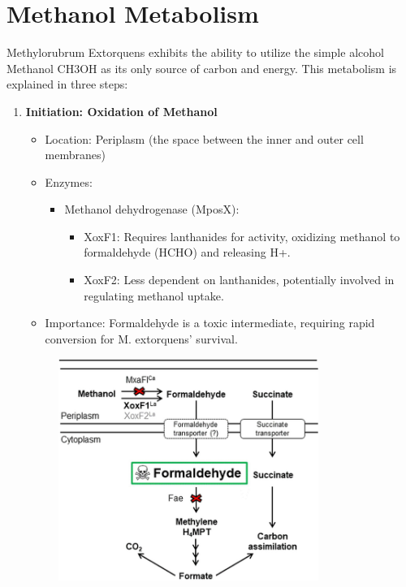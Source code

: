 \section{Methanol Metabolism}
Methylorubrum Extorquens exhibits the ability to utilize the simple alcohol Methanol
CH3OH as its only source of carbon and energy. This metabolism is explained in three
steps:

\begin{enumerate}
    \item \textbf{Initiation: Oxidation of Methanol}
    \begin{itemize}
        \item Location: Periplasm (the space between the inner and outer cell membranes)
        \item Enzymes:
        \begin{itemize}
            \item Methanol dehydrogenase (MposX):
            \begin{itemize}
                \item XoxF1: Requires lanthanides for activity, oxidizing methanol to
                formaldehyde (HCHO) and releasing H+.
                \item XoxF2: Less dependent on lanthanides, potentially involved in
                regulating methanol uptake.
            \end{itemize}
        \end{itemize}
        \item Importance: Formaldehyde is a toxic intermediate, requiring rapid conversion for M. extorquens' survival.
    \end{itemize}
    \begin{figure}[H]
        \centering
        \includegraphics[width=0.8\textwidth]{./media/images/mextorquens_metabolism_methanol}

\end{figure}
\end{enumerate}

